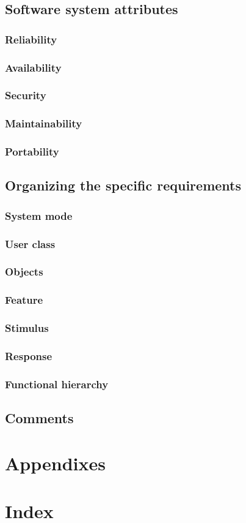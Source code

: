 \documentclass[draftclsnofoot,onecolumn,letterpaper,10pt,compsoc]{IEEEtran}
\begin{document}
	\subsection{Software system attributes}
		\subsubsection{Reliability}
		\subsubsection{Availability}
		\subsubsection{Security}
		\subsubsection{Maintainability}
		\subsubsection{Portability}
	\subsection{Organizing the specific requirements}
		\subsubsection{System mode}
		\subsubsection{User class}
		\subsubsection{Objects}
		\subsubsection{Feature}
		\subsubsection{Stimulus}
		\subsubsection{Response}
		\subsubsection{Functional hierarchy}
	\subsection{Comments}
\section{Appendixes}
\section{Index}

\pagebreak

\end{document}
